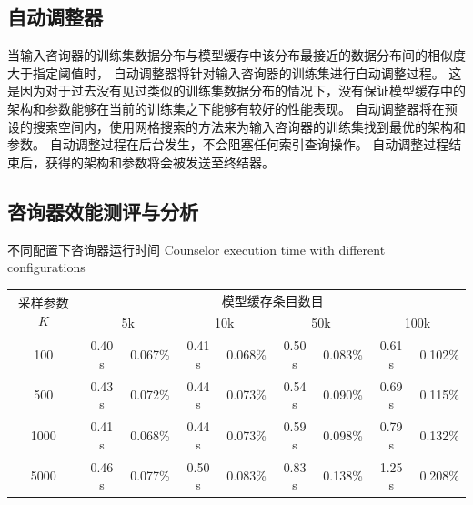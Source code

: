 
\subsection{自动调整器}

当输入咨询器的训练集数据分布与模型缓存中该分布最接近的数据分布间的相似度大于指定阈值时，
自动调整器将针对输入咨询器的训练集进行自动调整过程。
这是因为对于过去没有见过类似的训练集数据分布的情况下，没有保证模型缓存中的{\rmi}架构和参数能够在当前的训练集之下能够有较好的性能表现。
自动调整器将在预设的搜索空间内，使用网格搜索的方法来为输入咨询器的训练集找到最优的{\rmi}架构和参数。
自动调整过程在后台发生，不会阻塞任何索引查询操作。
自动调整过程结束后，获得的{\rmi}架构和参数将会被发送至终结器。


\subsection{咨询器效能测评与分析}

\begin{table}[!hpb]
  \centering
  \bicaption[不同配置下咨询器运行时间]
    {不同配置下咨询器运行时间}
    {Counselor execution time with different configurations}
  \label{tab:counselor}
  \begin{tabular}{ccccccccc}
    \toprule
    \multirow{2}{*}{采样参数$K$}  & \multicolumn{8}{c}{模型缓存条目数目}                                                                        \\ \cmidrule{2-9}
                                 & \multicolumn{2}{c}{5k}  & \multicolumn{2}{c}{10k}  & \multicolumn{2}{c}{50k}  & \multicolumn{2}{c}{100k}  \\ \midrule
    100           & 0.40 s  & 0.067\%  & 0.41 s  & 0.068\%  & 0.50 s  & 0.083\%  & 0.61 s  & 0.102\%  \\
    500           & 0.43 s  & 0.072\%  & 0.44 s  & 0.073\%  & 0.54 s  & 0.090\%  & 0.69 s  & 0.115\%  \\
    1000          & 0.41 s  & 0.068\%  & 0.44 s  & 0.073\%  & 0.59 s  & 0.098\%  & 0.79 s  & 0.132\%  \\
    5000          & 0.46 s  & 0.077\%  & 0.50 s  & 0.083\%  & 0.83 s  & 0.138\%  & 1.25 s  & 0.208\%  \\ \bottomrule
  \end{tabular}
\end{table}

